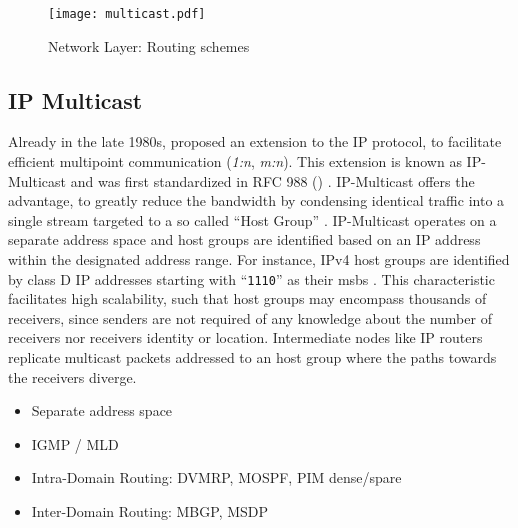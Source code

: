 \begin{figure}[h]
    \begin{center}
        \texttt{[image: multicast.pdf]}
    \end{center}
    \caption{Network Layer: Routing schemes}
    \label{fig:multicast}
\end{figure}


\subsection{IP Multicast} %
\label{sub:IP Multicast}
Already in the late 1980s, \citeauthor{deering1990multicast}
    \cite{deering1990multicast} proposed an extension to the IP protocol, to
    facilitate efficient multipoint communication (\textit{1:n}, \textit{m:n}).
This extension is known as IP-Multicast and was first standardized in RFC 988
    (\citeyear{rfc988_initmc}) \cite{rfc988_initmc}.
IP-Multicast offers the advantage, to greatly reduce the bandwidth by condensing
    identical traffic into a single stream targeted to a so called ``Host
    Group'' \cite{rfc1112_ip4mc}.
IP-Multicast operates on a separate address space and host groups are
    identified based on an IP address within the designated address range.
For instance, IPv4 host groups are identified by class D IP addresses starting
    with ``\texttt{1110}'' as their \glspl{msb} \cite{rfc1112_ip4mc}.
This characteristic facilitates high scalability, such that host groups may
    encompass thousands of receivers, since senders are not required of any
    knowledge about the number of receivers nor receivers identity or location.
Intermediate nodes like IP routers replicate multicast packets addressed to an
    host group where the paths towards the receivers diverge.
\begin{itemize}\itemsep0em
    \item Separate address space
    \item IGMP / MLD
    \item Intra-Domain Routing: DVMRP, MOSPF, PIM dense/spare
    \item Inter-Domain Routing: MBGP, MSDP
\end{itemize}



